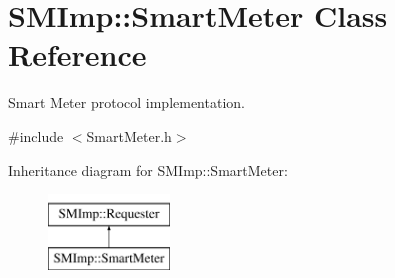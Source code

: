 \hypertarget{classSMImp_1_1SmartMeter}{}\section{S\+M\+Imp\+:\+:Smart\+Meter Class Reference}
\label{classSMImp_1_1SmartMeter}


Smart Meter protocol implementation.  




{\ttfamily \#include $<$Smart\+Meter.\+h$>$}

Inheritance diagram for S\+M\+Imp\+:\+:Smart\+Meter\+:\begin{figure}[H]
\begin{center}
\leavevmode
\includegraphics[height=2.000000cm]{classSMImp_1_1SmartMeter}
\end{center}
\end{figure}
